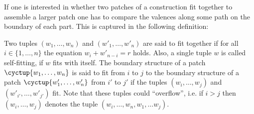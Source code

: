 If one is interested in whether two patches of a construction fit together to assemble a larger patch one has to compare the valences along some path on the boundary of each part. This is captured in the following definition:
\begin{definition}
  Two tuples $(w_1, \dots, w_n)$ and $(w'_1, \dots, w'_n)$ are said to fit together if for all $i \in \{1, \dots, n \}$ the equation $w_i + w'_{n-i} = r$ holds. Also, a single tuple $w$ is called self-fitting, if $w$ fits with itself. The boundary structure of a patch $\cyctup{w_1, \dots, w_n}$ is said to fit from $i$ to $j$ to the boundary structure of a patch $\cyctup{w'_1, \dots, w'_n}$ from $i'$ to $j'$ if the tuples $(w_i, \dots, w_j)$ and $(w'_{i'}, \dots, w'_{j'})$ fit. Note that these tuples could ``overflow'', i.e. if $i > j$ then $(w_i, \dots, w_j)$ denotes the tuple $(w_i, \dots, w_n, w_1, \dots w_j)$.
\end{definition}

